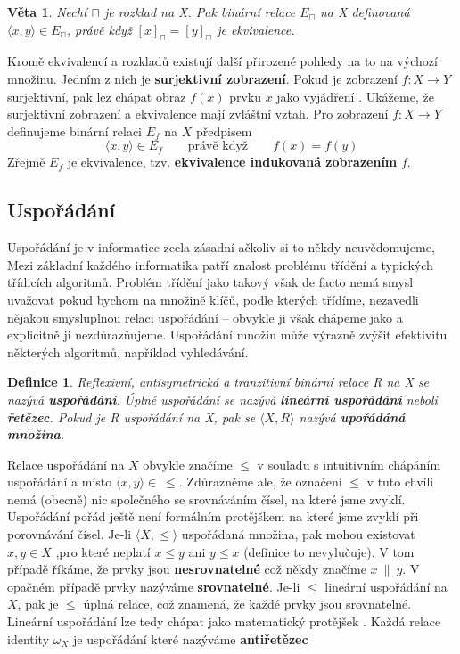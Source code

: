 \documentclass[12pt,a4paper]{article}
\newtheorem{definition}{Definice}
\newtheorem{sentence}{Věta}
\begin{document}
\begin{sentence}
	Nechť $\sqcap$ je rozklad na X. Pak binární relace $E_\sqcap$ na X definovaná $\langle x,y \rangle \in E_\sqcap$, právě když $[x]_\sqcap = [y]_\sqcap$ je ekvivalence.
\end{sentence}

Kromě ekvivalencí a rozkladů existují další přirozené pohledy na to  na výchozí množinu. Jedním z nich je \textbf{surjektivní zobrazení}. Pokud je zobrazení $f : X \rightarrow Y$ surjektivní, pak lez chápat obraz $f(x)$ prvku $x$ jako vyjádření . Ukážeme, že surjektivní zobrazení a ekvivalence mají zvláštní vztah. Pro zobrazení $f : X \rightarrow Y$ definujeme binární relaci $E_f$ na $X$ předpisem $$\langle x , y \rangle \in E_f \qquad \text{právě když} \qquad f(x) = f(y)$$
Zřejmě $E_f$ je ekvivalence, tzv. \textbf{ekvivalence indukovaná zobrazením} $f$.

\subsection{Uspořádání}
Uspořádání je v informatice zcela zásadní ačkoliv si to někdy neuvědomujeme, Mezi základní každého informatika patří znalost problému třídění a typických třídicích algoritmů. Problém třídění jako takový však de facto nemá smysl uvažovat pokud bychom na množině klíčů, podle kterých třídíme, nezavedli nějakou smysluplnou relaci uspořádání -- obvykle ji však chápeme jako  a explicitně ji nezdůrazňujeme. Uspořádání množin může výrazně zvýšit efektivitu některých algoritmů, například vyhledávání.

\begin{definition}
	Reflexivní, antisymetrická a tranzitivní binární relace R na X se nazývá \textbf{uspořádání}. Úplné uspořádání se nazývá \textbf{lineární uspořádání} neboli \textbf{řetězec}. Pokud je R uspořádání na X, pak se $\langle X, R \rangle$ nazývá \textbf{upořádáná množina}.
\end{definition}

Relace uspořádání na $X$ obvykle značíme $\leq$ v souladu s intuitivním chápáním uspořádání a místo $\langle x ,y \rangle \in \ \leq$. Zdůrazněme ale, že označení $\leq$ v tuto chvíli nemá (obecně) nic společného se srovnáváním čísel, na které jsme zvyklí. Uspořádání pořád ještě není formálním protějškem  na které jsme zvyklí při porovnávání čísel. Je-li $\langle X, \leq \rangle$ uspořádaná množina, pak mohou  existovat $x,y \in X$ ,pro které neplatí $x \leq y$ ani $y \leq x$ (definice to nevylučuje). V tom případě říkáme, že prvky jsou \textbf{nesrovnatelné} což někdy značíme $x\ \| \ y$. V opačném případě prvky nazýváme \textbf{srovnatelné}. Je-li $\leq$ lineární uspořádání na $X$, pak je $\leq$ úplná relace, což znamená, že každé prvky jsou srovnatelné. Lineární uspořádání lze tedy chápat jako matematický protějšek . Každá relace identity $\omega_X$ je uspořádání které nazýváme \textbf{antiřetězec}
\end{document}
